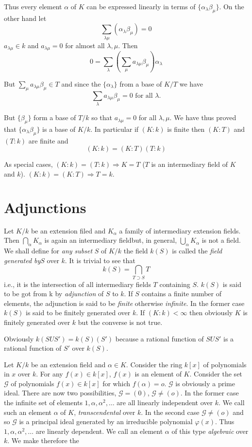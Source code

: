 Thus every element $\alpha$ of $K$ can be expressed linearly in terms
of $\{ \alpha_{\lambda} \beta_{\mu}\}$. On the other hand let 
$$
\sum_{\lambda \mu} (\alpha_{\lambda} \beta_{\mu}) = 0
$$
$a_{\lambda\mu} \in k$ and $a_{\lambda \mu} =0$ for almost all $\lambda ,
\mu$. Then  
$$
0 = \sum_{\lambda}(\sum_{\mu} a_{\lambda \mu} \beta_{\mu})
\alpha_{\lambda} 
$$

But $\sum_{\mu} a_{\lambda \mu} \beta_{\mu} \in T$ and since the
$\{\alpha _{\lambda}\}$ from a base of $K/T$ we have  
$$
\sum_{\lambda} a_{\lambda \mu} \beta_{\mu} =0 \text{ for all } \lambda .
$$

But $\{ \beta_{\mu}\}$ form a base of $T/ k$ so that $a_{\lambda \mu}
=0$ for all $\lambda, \mu$. We have thus proved that
$\{\alpha_{\lambda} \beta_{\mu}\}$ is a base of $K/k$. In particular
if $(K : k)$ is finite then $(K : T)$ and $(T : k)$ are finite and  
$$
(K:k) = (K:T) (T:k)
$$

As special  cases, $(K:k) = (T: k) \Longrightarrow K =T $ ($T$ is an
intermediary field of $K$ and $k$). $(K:k) = (K:T) \Longrightarrow T=
k$. 

\section{Adjunctions}\label{c1:s2}%

Let $K/k$ be an extension filed and $K_{\alpha}$ a family of
intermediary extension fields. Then $\bigcap\limits_{\alpha}
K_{\alpha}$ is again an intermediary field\pageoriginale but, in general,
$\bigcup\limits_{\alpha}K_{\alpha}$ is not a field. We shall define
for \textit{any subset} $S$ of $K/k$ the field $k(S)$ is called the
\textit{field generated by}$S$ over $k$. It is trivial to see that 
$$
k(S) = \bigcap_{T \supset S} T
$$
i.e., it is the intersection of all intermediary fields $T$ containing
$S$. $k(S)$ is said to be got from k by \textit{adjunction} of $S$ to
$k$. If $S$ contains a finite number of elements, the adjunction is
said to be \textit{finite} otherwise \textit{infinite}. In the former
case $k(S)$ is said to be finitely generated over $k$. If $(K : k) <
\infty$ then obviously $K$ is finitely generated over $k$ but the
converse is not true. 

Obviously $k (S U S') = k (S) (S')$ because a rational function of $ S
U S'$ is a rational function of $S'$ over $k(S)$. 

Let $K/k$ be an extension field and $\alpha \in K$. Consider the ring
$k[x]$ of polynomials in $x$ over $k$. For any $f(x) \in k [x]$, $f(x)$
is an element of $K$. Consider the set $\mathscr{G}$ of polynomials
$f(x) \in k[x]$ for which $f(\alpha) =o$. $\mathscr{G}$ is obviously a
prime ideal. There are now two possibilities, $\mathscr{G} = (0)$,
$\mathscr{G} \neq (o)$. In the former case the infinite set of elements
$1, \alpha , \alpha^2, \ldots$ are all linearly  independent over
$k$. We call such an element $\alpha$ of $K$, \textit{transcendental}
over $k$. In the second case $\mathscr{G} \neq (o)$ and so
$\mathscr{G}$  is a principal ideal generated by an irreducible
polynomial $\varphi (x)$. Thus $1, \alpha , \alpha^2 , \ldots$ are
linearly dependent. We call an element $\alpha$ of this type
\textit{algebraic} over $k$. We make therefore the  

